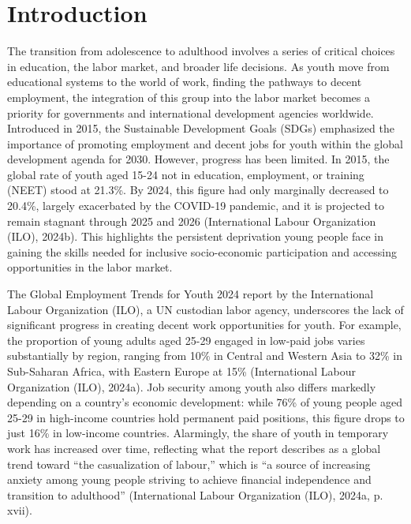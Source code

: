 \documentclass[
]{interact}
\begin{document}
\section{Introduction}\label{introduction}

The transition from adolescence to adulthood involves a series of
critical choices in education, the labor market, and broader life
decisions. As youth move from educational systems to the world of work,
finding the pathways to decent employment, the integration of this group
into the labor market becomes a priority for governments and
international development agencies worldwide. Introduced in 2015, the
Sustainable Development Goals (SDGs) emphasized the importance of
promoting employment and decent jobs for youth within the global
development agenda for 2030. However, progress has been limited. In
2015, the global rate of youth aged 15-24 not in education, employment,
or training (NEET) stood at 21.3\%. By 2024, this figure had only
marginally decreased to 20.4\%, largely exacerbated by the COVID-19
pandemic, and it is projected to remain stagnant through 2025 and 2026
(International Labour Organization (ILO), 2024b). This highlights the
persistent deprivation young people face in gaining the skills needed
for inclusive socio-economic participation and accessing opportunities
in the labor market.

The Global Employment Trends for Youth 2024 report by the International
Labour Organization (ILO), a UN custodian labor agency, underscores the
lack of significant progress in creating decent work opportunities for
youth. For example, the proportion of young adults aged 25-29 engaged in
low-paid jobs varies substantially by region, ranging from 10\% in
Central and Western Asia to 32\% in Sub-Saharan Africa, with Eastern
Europe at 15\% (International Labour Organization (ILO), 2024a). Job
security among youth also differs markedly depending on a country's
economic development: while 76\% of young people aged 25-29 in
high-income countries hold permanent paid positions, this figure drops
to just 16\% in low-income countries. Alarmingly, the share of youth in
temporary work has increased over time, reflecting what the report
describes as a global trend toward ``the casualization of labour,''
which is ``a source of increasing anxiety among young people striving to
achieve financial independence and transition to adulthood''
(International Labour Organization (ILO), 2024a, p. xvii).
\end{document}
